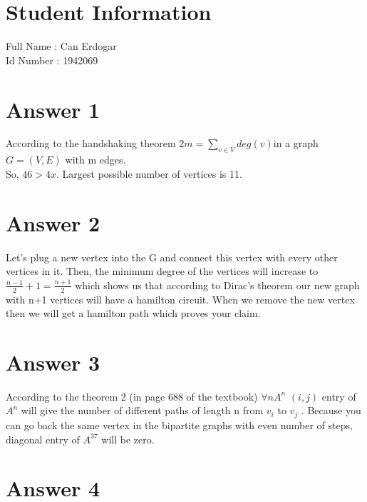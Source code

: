 \documentclass[11pt]{article}
\begin{document}
	
\section*{Student Information } 
Full Name :  Can Erdogar \\
Id Number :  1942069 \\

\section*{Answer 1}
According to the handshaking theorem $2m = \sum_{v \in V} deg(v)$in a graph $G=(V,E)$ with m edges. \\
So, $46>4x$. Largest possible number of vertices is 11. \\

\section*{Answer 2}
Let's plug a new vertex into the G and connect this vertex with every other vertices in it. Then, the minimum degree of the vertices will increase to $\frac{n-1}{2} +1 =\frac{n+1}{2}$ which shows us that according to Dirac's theorem our new graph with n+1 vertices will have a hamilton circuit. When we remove the new vertex then we will get a hamilton path which proves your claim. \\

\section*{Answer 3}
According to the theorem 2 (in page 688 of the textbook) $\forall n A^{n}$ $(i,j)$ entry of $A^{n}$ will give the number of different paths of length n from $v_i$ to $v_j$ .  Because you can go back the same vertex in the bipartite graphs with even number of steps, diagonal entry of $A^{37}$ will be zero. \\

\section*{Answer 4}
\end{document}
